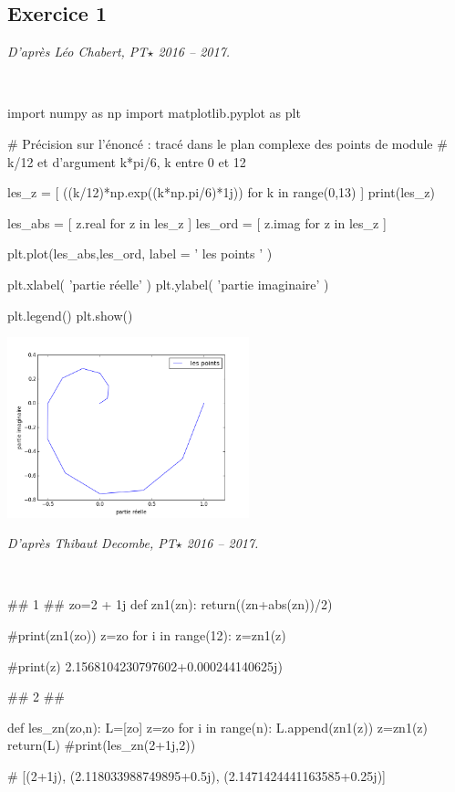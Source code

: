 \documentclass[10pt,fleqn]{article} %
\begin{document}
\subsection*{Exercice 1}

\textit{D'après Léo Chabert, PT$\star$ 2016 -- 2017.}
\begin{corrige}
$\quad$
\begin{python}

import numpy as np
import matplotlib.pyplot as plt

# Précision sur l'énoncé : tracé dans le plan complexe des points de module
# k/12 et d'argument k*pi/6, k entre 0 et 12 

les_z = [ ((k/12)*np.exp((k*np.pi/6)*1j)) for k in range(0,13) ]
print(les_z)

les_abs = [ z.real for z in les_z ]
les_ord = [ z.imag for z in les_z ]

plt.plot(les_abs,les_ord, label = ' les points ' )

plt.xlabel( 'partie réelle' )
plt.ylabel( 'partie imaginaire' )

plt.legend()
plt.show()
\end{python}
\end{corrige}
\includegraphics[width=7cm]{programmes/Exercice_2015_01/Exercice_2015_01_Chabert}

\textit{D'après Thibaut Decombe, PT$\star$ 2016 -- 2017.}
\begin{corrige}
$\quad$
\begin{python}
## 1 ##
zo=2 + 1j
def zn1(zn):
    return((zn+abs(zn))/2)

#print(zn1(zo))
z=zo
for i in range(12):
    z=zn1(z)
    
#print(z)  2.1568104230797602+0.000244140625j)
    
## 2 ##
    
def les_zn(zo,n):
    L=[zo]
    z=zo
    for i in range(n):
        L.append(zn1(z))
        z=zn1(z)
    return(L)
#print(les_zn(2+1j,2))

# [(2+1j), (2.118033988749895+0.5j), (2.1471424441163585+0.25j)]
\end{python}
\end{corrige}
\end{document}

